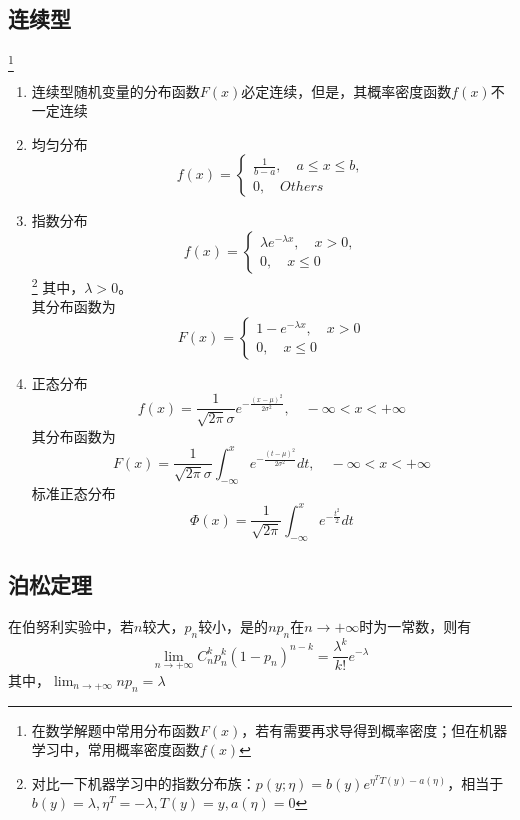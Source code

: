 \subsection{连续型}\footnote{在数学解题中常用分布函数$F(x)$，若有需要再求导得到概率密度；但在机器学习中，常用概率密度函数$f(x)$}
\begin{enumerate}
	\item 连续型随机变量的分布函数$F(x)$必定连续，但是，其概率密度函数$f(x)$不一定连续
	\item 均匀分布
	\[ f(x)=\begin{cases}
	\frac{1}{b-a}, \quad a \leq x \leq b, \\
	0, \quad Others
	\end{cases} \]

	\item 指数分布
	\[ f(x)=\begin{cases}
	\lambda e^{-\lambda x}, \quad x>0, \\
	0, \quad x \leq 0
	\end{cases} \]
	\footnote{对比一下机器学习中的指数分布族：$p(y;\eta) = b(y)e^{\eta^T T(y) - a(\eta)}$，相当于$b(y)=\lambda, \eta^T=-\lambda, T(y)=y, a(\eta)=0$}
	其中，$\lambda>0$。\\
	其分布函数为
	\[ F(x)=\begin{cases}
	1-e^{-\lambda x}, \quad x>0 \\
	0, \quad x \leq 0
	\end{cases} \]

	\item 正态分布
	\begin{equation}
		f(x) = \frac{1}{\sqrt{2\pi} \sigma}e^{-\frac{(x-\mu)^2}{2\sigma^2}}, \quad -\infty < x < +\infty
	\end{equation}
	其分布函数为
	\begin{equation}
		F(x) = \frac{1}{\sqrt{2\pi}\sigma} \int_{-\infty}^x  e^{-\frac{(t-\mu)^2}{2\sigma^2}} dt, \quad -\infty < x < +\infty
	\end{equation}
	标准正态分布
	\begin{equation}
		\Phi(x) = \frac{1}{\sqrt{2\pi}} \int_{-\infty}^x e^{-\frac{t^2}{2}} dt
	\end{equation}
\end{enumerate}

\subsection{泊松定理}
在伯努利实验中，若$n$较大，$p_n$较小，是的$np_n$在$n \to +\infty$时为一常数，则有
\begin{equation}
	\lim_{n \to +\infty}C_n^kp_n^k(1-p_n)^{n-k} = \frac{\lambda ^k}{k!}e^{-\lambda}
\end{equation}
其中，$\lim_{n\to+\infty}np_n = \lambda$






